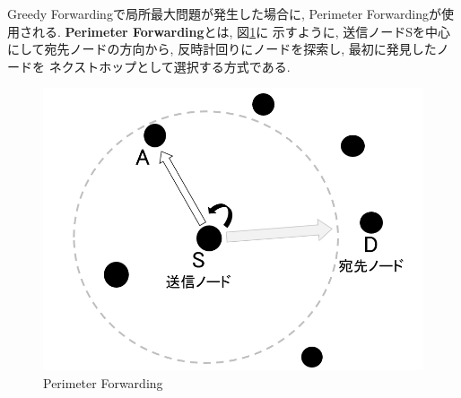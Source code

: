 \indent Greedy Forwardingで局所最大問題が発生した場合に, 
Perimeter Forwardingが使用される. 
\textbf{Perimeter Forwarding}とは, 図\ref{fig:perimeter}に
示すように, 送信ノードSを中心にして宛先ノードの方向から,  
反時計回りにノードを探索し, 最初に発見したノードを
ネクストホップとして選択する方式である.

\begin{figure}
  \centering
  \includegraphics[scale=0.55]{figures/perimeter.png}
  \caption{Perimeter Forwarding}
  \label{fig:perimeter}
\end{figure}